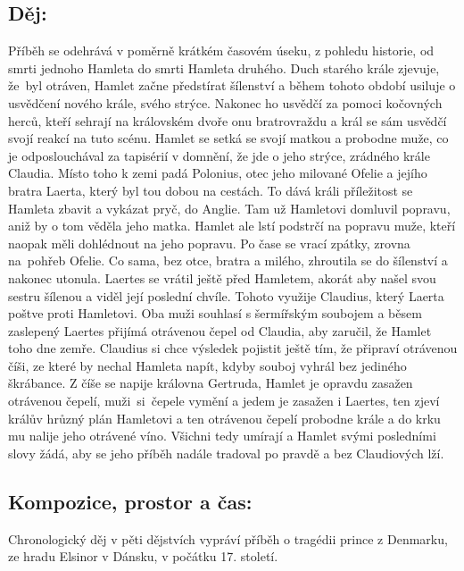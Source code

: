 \documentclass[A4paper]{extarticle} %
\begin{document}
\subsection*{Děj:}
\noindent 
Příběh se odehrává v poměrně krátkém časovém úseku, z pohledu historie, od smrti jednoho Hamleta do smrti Hamleta druhého.
Duch starého krále zjevuje, že~byl otráven, Hamlet začne předstírat šílenství a během tohoto období usiluje o usvědčení nového krále, svého strýce.
Nakonec ho usvědčí za pomoci kočovných herců, kteří sehrají na královském dvoře onu bratrovraždu a král se sám usvědčí svojí reakcí na tuto scénu.
Hamlet se setká se svojí matkou a probodne muže, co je odposlouchával za tapisérií v domnění, že jde o jeho strýce, zrádného krále Claudia.
Místo toho k zemi padá Polonius, otec jeho milované Ofelie a jejího bratra Laerta, který byl tou dobou na cestách.
To dává králi příležitost se Hamleta zbavit a vykázat pryč, do Anglie.
Tam už Hamletovi domluvil popravu, aniž by o tom věděla jeho matka.
Hamlet ale lstí podstrčí na popravu muže, kteří naopak měli dohlédnout na jeho popravu.
Po čase se vrací zpátky, zrovna na~pohřeb Ofelie. Co sama, bez otce, bratra a milého, zhroutila se do šílenství a nakonec utonula.
Laertes se vrátil ještě před Hamletem, akorát aby našel svou sestru šílenou a viděl její poslední chvíle.
Tohoto využije Claudius, který Laerta poštve proti Hamletovi.
Oba muži souhlasí s šermířským soubojem a běsem zaslepený Laertes přijímá otrávenou čepel od Claudia, aby zaručil, že Hamlet toho dne zemře.
Claudius si chce výsledek pojistit ještě tím, že připraví otrávenou číši, ze které by nechal Hamleta napít, kdyby souboj vyhrál bez jediného škrábance.
Z číše se napije královna Gertruda, Hamlet je opravdu zasažen otrávenou čepelí, muži~si~čepele vymění a jedem je zasažen i Laertes, ten zjeví králův hrůzný plán Hamletovi a ten otrávenou čepelí probodne krále a do krku mu nalije jeho otrávené víno.
Všichni tedy umírají a Hamlet svými posledními slovy žádá, aby se jeho příběh nadále tradoval po pravdě a bez Claudiových lží.

\subsection*{Kompozice, prostor a čas:}
\noindent 
Chronologický děj v pěti dějstvích vypráví příběh o tragédii prince z Denmarku, ze hradu Elsinor v Dánsku, v počátku 17. století.

\end{document}
